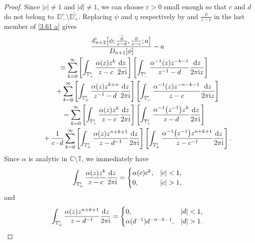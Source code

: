 \documentclass[pdftex]{sigma}
\numberwithin{equation}{section}
\newcommand{\C}{{\mathbb C}}
\newcommand{\D}{{\mathbb D}}
\newcommand{\T}{{\mathbb T}}
\newcommand{\al}{\alpha}
\newcommand{\ep}{\varepsilon}
\newcommand{\di}{\displaystyle}
\newcommand{\ii}{{\rm i}}
\newcommand{\dd}{{\rm d}}
\begin{document}
\begin{proof}
			Since $|c| \neq 1$ and $|d| \neq 1$, we can choose $\varepsilon>0$ small enough so that $c$ and $d$ do not belong to~$\D^{\ep}_- \setminus \overline{\D^{\ep}_+}$. Replacing $\psi$ and $\eta$ respectively by  and $\frac{\phi}{z-c}$ in the last member of \eqref{3.61 a} gives
			\begin{gather}
					\frac{\mathscr{E}_{n+2}\big[\phi;\di \tfrac{\tilde{\phi}}{z-d}, \tfrac{\phi}{z-c} ;a\big]}{D_{n+1}[\phi]} - a\nonumber\\
\qquad\simeq \sum_{k=0}^{\infty} \left[ \int_{\T^{\mathfrak{r}}_{+}} \frac{\al(z) z^k}{z-c} \frac{\dd z}{2 \pi \ii} \right] \left[ \int_{\T^{\mathfrak{r}}_{-}} \frac{\al^{-1}(z) z^{-k-1}}{z^{-1}-d} \frac{\dd z}{2 \pi \ii z} \right] \nonumber\\
\phantom{\qquad\simeq}{}+ \sum_{k=0}^{\infty} \left[ \int_{\T^{\mathfrak{r}}_{+}} \frac{\al(z) z^{k+n}}{z^{-1}-d} \frac{\dd z}{2 \pi \ii} \right] \left[ \int_{\T^{\mathfrak{r}}_{-}} \frac{\al^{-1}(z) z^{-n-k-1}}{z-c} \frac{\dd z}{2 \pi \ii z} \right] \nonumber\\
\qquad= \sum_{k=0}^{\infty} \left[ \int_{\T^{\mathfrak{r}}_{+}} \frac{\al(z) z^k}{z-c} \frac{\dd z}{2 \pi \ii} \right] \left[ \int_{\T^{\mathfrak{r}}_{+}} \frac{\al^{-1}\big(z^{-1}\big) z^{k}}{z-d} \frac{\dd z}{2 \pi \ii} \right]\nonumber\\
\phantom{\qquad\simeq}{}+ \frac{1}{c\cdot d} \sum_{k=0}^{\infty} \left[
					\int_{\T^{\mathfrak{r}}_{+}} \frac{\al(z) z^{n+k+1}}{z-d^{-1}} \frac{\dd z}{2 \pi \ii} \right] \left[ \int_{\T^{\mathfrak{r}}_{+}} \frac{\al^{-1}\big(z^{-1}\big) z^{n+k+1}}{z-c^{-1}} \frac{\dd z}{2 \pi \ii} \right].\label{3.63 a}
			\end{gather}
			Since $\al$ is analytic in $\C \setminus \T$, we immediately have
			\begin{equation*}
				\int_{\T^{\mathfrak{r}}_{+}} \frac{\al(z) z^k}{z-c} \frac{\dd z}{2 \pi \ii} = \begin{cases}
					\al(c)c^k, & |c|<1, \\
					0, & |c|>1,
				\end{cases}
			\end{equation*} and
			\begin{equation*}
				\int_{\T^{\mathfrak{r}}_{+}} \frac{\al(z) z^{n+k+1}}{z-d^{-1}} \frac{\dd z}{2 \pi \ii} = \begin{cases}
					0, & |d|<1, \\
					\al(d^{-1}) d^{-n-k-1}, & |d|>1.
				\end{cases}
			\end{equation*}

\end{proof}
\end{document}
